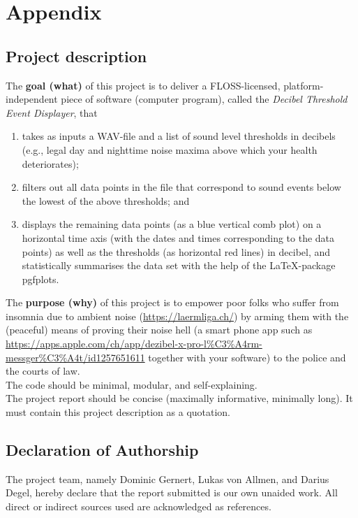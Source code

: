 \section{Appendix}\label{sec:appendix}

\subsection{Project description}\label{subsec:project-description}

The \textbf{goal (what)} of this project is to deliver a FLOSS-licensed, platform-independent piece of
software (computer program), called the \textit{Decibel Threshold Event Displayer}, that

\begin{enumerate}
    \item takes as inputs a WAV-file and a list of sound level thresholds in decibels (e.g., legal day
          and nighttime noise maxima above which your health deteriorates);
    \item filters out all data points in the file that correspond to sound events below the lowest of
          the above thresholds; and
    \item displays the remaining data points (as a blue vertical comb plot) on a horizontal time
          axis (with the dates and times corresponding to the data points) as well as the
          thresholds (as horizontal red lines) in decibel, and statistically summarises the data set
          with the help of the LaTeX-package pgfplots.
\end{enumerate}

The \textbf{purpose (why)} of this project is to empower poor folks who suffer from insomnia due to
ambient noise (\url{https://laermliga.ch/}) by arming them with the (peaceful) means of proving
their noise hell (a smart phone app such as \url{https://apps.apple.com/ch/app/dezibel-x-pro-l\%C3\%A4rm-messger\%C3\%A4t/id1257651611}
together with your software) to the police and the courts of law. \\

The code should be minimal, modular, and self-explaining. \\

The project report should be concise (maximally informative, minimally long). It must contain
this project description as a quotation.

\subsection{Declaration of Authorship}
The project team, namely Dominic Gernert, Lukas von Allmen, and Darius Degel, hereby declare that the report submitted is our own unaided work. All direct or indirect sources used are acknowledged as references.